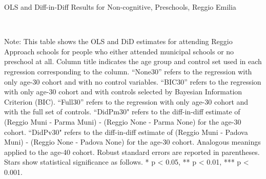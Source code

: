 \begin{landscape}
\begin{table}[H] \caption{OLS and Diff-in-Diff Results for Non-cognitive, Preschools, Reggio Emilia} \label{ols-N-reg}
\scalebox{0.85}{
}
\vspace{1ex} \\
\footnotesize\raggedright{Note: This table shows the OLS and DiD estimates for attending Reggio Approach schools for people who either attended municipal schools or no preschool at all. Column title indicates the age group and control set used in each regression corresponding to the column. ``None30'' refers to the regression with only age-30 cohort and with no control variables. ``BIC30'' refers to the regression with only age-30 cohort and with controls selected by Bayesian Information Criterion (BIC). ``Full30'' refers to the regression with only age-30 cohort and with the full set of controls. ``DidPm30" refers to the diff-in-diff estimate of (Reggio Muni - Parma Muni) - (Reggio None - Parma None) for the age-30 cohort. ``DidPv30" refers to the diff-in-diff estimate of (Reggio Muni - Padova Muni) - (Reggio None - Padova None) for the age-30 cohort. Analogous meanings applied to the age-40 cohort. Robust standard errors are reported in parentheses. Stars show statistical significance as follows. * p < 0.05, ** p < 0.01, *** p < 0.001.}
\end{table}



\end{landscape}
